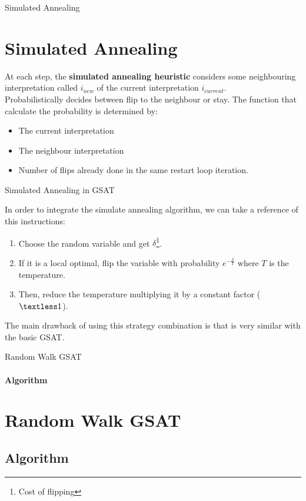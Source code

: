 \documentclass{beamer}
\begin{document}
\begin{frame}{Simulated Annealing}
\section{Simulated Annealing}
\begin{flushleft}

At each step, the \textbf{simulated annealing heuristic }considers some neighbouring interpretation called $i_{new}$ of the current interpretation $i_{current}$.
\\
Probabilistically decides between flip to the neighbour or stay. The function that calculate the probability is determined by:
\end{flushleft}
\begin{itemize}
	\item The current interpretation
	\item The neighbour interpretation
	\item Number of flips already done in the same restart loop iteration.
\end{itemize}
\end{frame}
\begin{frame}{Simulated Annealing in GSAT}
\begin{flushleft}
In order to integrate the simulate annealing algorithm, we can take a reference of this instructions:
\end{flushleft}
\begin{enumerate}
	\item Choose the random variable and get $\delta$\footnote{Cost of flipping}.
	\item If it is a local optimal, flip the variable with probability $e^{-\frac{\delta}{T}}$ where $T$ is the temperature.
	\item Then, reduce the temperature multiplying it by a constant factor ($\textless 1$).
\end{enumerate}
\begin{flushleft}
The main drawback of using this strategy combination is that is very similar with the basic GSAT.
\end{flushleft}
\end{frame}

\begin{frame}{Random Walk GSAT}
\framesubtitle{Algorithm}
\section{Random Walk GSAT}
\subsection{Algorithm}
\end{frame}
\end{document}
